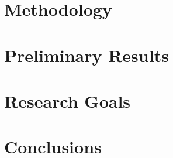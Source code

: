 \documentclass[12pt]{article}
\newcommand{\refdir}{../dissertation}
\begin{document}
\section{Methodology\label{sec:methodology}}
\section{Preliminary Results\label{sec:results}}
\section{Research Goals\label{sec:goals}}
\section{Conclusions\label{sec:conclusions}}



\end{document}
